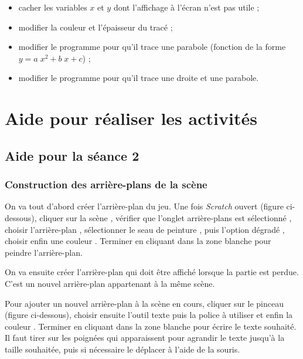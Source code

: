 \begin{itemize}
\item cacher les variables $x$ et $y$ dont l'affichage à l'écran n'est pas utile ;
\item modifier la couleur et l'épaisseur du tracé ; 
\item modifier le programme pour qu'il trace une parabole (fonction de la forme $y=a \; x^2 + b \; x + c$) ;
\item modifier le programme pour qu'il trace une droite et une parabole. 
\end{itemize}


\newpage

\section{Aide pour réaliser les activités}

\subsection{Aide pour la séance 2}\label{aide_seanceScratch2}

\subsubsection{Construction des arrière-plans de la scène}

On va tout d'abord créer l'arrière-plan du jeu. Une fois \emph{Scratch} ouvert (figure ci-dessous), cliquer sur la scène , vérifier que l'onglet arrière-plans est sélectionné , choisir l'arrière-plan  , sélectionner le seau de peinture , puis l'option dégradé , choisir enfin une couleur . Terminer en cliquant dans la zone blanche pour peindre l'arrière-plan.

	      
On va ensuite créer l'arrière-plan qui doit être affiché lorsque la partie est perdue. C'est un nouvel arrière-plan appartenant à la même scène.

Pour ajouter un nouvel arrière-plan à la scène en cours, cliquer sur le pinceau  (figure ci-dessous), choisir ensuite l'outil texte  puis la police à utiliser  et enfin la couleur . Terminer en cliquant dans la zone blanche pour écrire le texte souhaité. Il faut tirer sur les poignées qui apparaissent pour agrandir le texte jusqu'à la taille souhaitée, puis si nécessaire le déplacer à l'aide de la souris.

